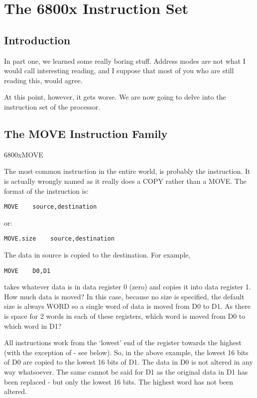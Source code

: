 \chapter{The 6800x Instruction Set}

\section{Introduction}
\label{ch2-intro}%

In part one, we learned some really boring stuff. Address modes are
    not what I would call interesting reading, and I suppose that most of you
    who are still reading this, would agree.

At this point, however, it gets worse. We are now going to delve
    into the instruction set of the processor.

\section{The MOVE Instruction Family}\mc6800x{MOVE}
\label{ch2-move}%

The most common instruction in the entire world, is probably the
     instruction. It is actually wrongly named as it really does a COPY
    rather than a MOVE. The format of the  instruction is:


\begin{lstlisting}[firstnumber=1,]
          MOVE    source,destination
\end{lstlisting}


or:


\begin{lstlisting}[firstnumber=1,]
          MOVE.size    source,destination
\end{lstlisting}


The data in source is copied to the destination. For
    example,
\begin{lstlisting}[firstnumber=1,]
          MOVE    D0,D1
\end{lstlisting}
takes whatever data
    is in data register 0 (zero) and copies it into data register 1. How much
    data is moved? In this case, because no size is specified, the default
    size is always WORD so a single word of data is moved from D0 to D1. As
    there is space for 2 words in each of these registers, which word is moved
    from D0 to which word in D1?

All instructions work from the `lowest' end of the register towards
    the highest (with the exception of  -{} see below). So, in the above
    example, the lowest 16 bits of D0 are copied to the lowest 16 bits of D1.
    The data in D0 is not altered in any way whatsoever. The same cannot be
    said for D1 as the original data in D1 has been replaced -{} but only the
    lowest 16 bits. The highest word has not been altered.

